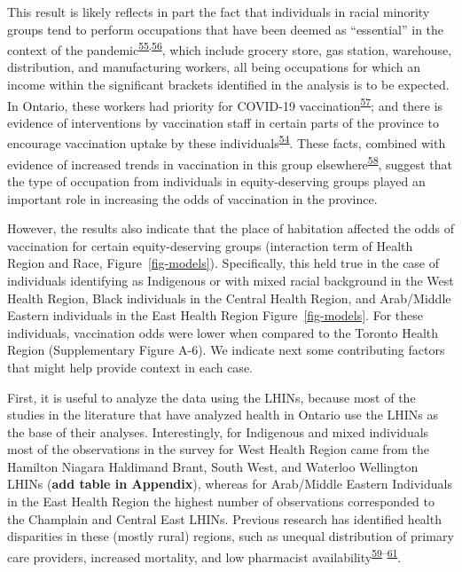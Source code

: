 \documentclass[
  letterpaper,
  DIV=11,
  numbers=noendperiod]{scrartcl}
\begin{document}
This result is likely reflects in part the fact that individuals in
racial minority groups tend to perform occupations that have been deemed
as ``essential'' in the context of the
pandemic\textsuperscript{\protect\hyperlink{ref-hawkins2020}{55},\protect\hyperlink{ref-ct2021}{56}},
which include grocery store, gas station, warehouse, distribution, and
manufacturing workers, all being occupations for which an income within
the significant brackets identified in the analysis is to be expected.
In Ontario, these workers had priority for COVID-19
vaccination\textsuperscript{\protect\hyperlink{ref-mishra2021}{57}}; and
there is evidence of interventions by vaccination staff in certain parts
of the province to encourage vaccination uptake by these
individuals\textsuperscript{\protect\hyperlink{ref-gill2022}{54}}. These
facts, combined with evidence of increased trends in vaccination in this
group
elsewhere\textsuperscript{\protect\hyperlink{ref-nguyen2021b}{58}},
suggest that the type of occupation from individuals in equity-deserving
groups played an important role in increasing the odds of vaccination in
the province.

However, the results also indicate that the place of habitation affected
the odds of vaccination for certain equity-deserving groups (interaction
term of Health Region and Race, Figure~\ref{fig-models}). Specifically,
this held true in the case of individuals identifying as Indigenous or
with mixed racial background in the West Health Region, Black
individuals in the Central Health Region, and Arab/Middle Eastern
individuals in the East Health Region Figure~\ref{fig-models}. For these
individuals, vaccination odds were lower when compared to the Toronto
Health Region (Supplementary Figure A-6). We indicate next some
contributing factors that might help provide context in each case.

First, it is useful to analyze the data using the LHINs, because most of
the studies in the literature that have analyzed health in Ontario use
the LHINs as the base of their analyses. Interestingly, for Indigenous
and mixed individuals most of the observations in the survey for West
Health Region came from the Hamilton Niagara Haldimand Brant, South
West, and Waterloo Wellington LHINs (\textbf{add table in Appendix}),
whereas for Arab/Middle Eastern Individuals in the East Health Region
the highest number of observations corresponded to the Champlain and
Central East LHINs. Previous research has identified health disparities
in these (mostly rural) regions, such as unequal distribution of primary
care providers, increased mortality, and low pharmacist
availability\textsuperscript{\protect\hyperlink{ref-shah2019}{59}--\protect\hyperlink{ref-timony2022}{61}}.
\end{document}

